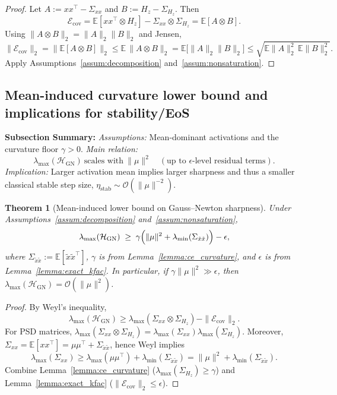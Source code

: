 \documentclass[11pt]{article}
\newtheorem{theorem}{Theorem}
\begin{document}
\begin{proof}
Let $A:=xx^\top-\Sigma_{xx}$ and $B:=H_z-\Sigma_{H_z}$. Then
\[
\mathcal{E}_{\mathrm{cov}}
=
\mathbb{E}[xx^\top\otimes H_z]-\Sigma_{xx}\otimes\Sigma_{H_z}
=
\mathbb{E}[A\otimes B].
\]
Using $\|A\otimes B\|_2=\|A\|_2\|B\|_2$ and Jensen,
\[
\|\mathcal{E}_{\mathrm{cov}}\|_2
=
\bigl\|\mathbb{E}[A\otimes B]\bigr\|_2
\le
\mathbb{E}\,\|A\otimes B\|_2
=
\mathbb{E}\bigl[\|A\|_2\|B\|_2\bigr]
\le
\sqrt{\mathbb{E}\|A\|_2^2\,\mathbb{E}\|B\|_2^2}.
\]
Apply Assumptions~\ref{assum:decomposition} and~\ref{assum:nonsaturation}.
\end{proof}

\subsection{Mean-induced curvature lower bound and implications for stability/EoS}

\textbf{Subsection Summary:}
\textit{Assumptions:} Mean-dominant activations and the curvature floor $\gamma>0$.
\textit{Main relation:} 
\[
\lambda_{\max}(\mathcal{H}_{\mathrm{GN}})\ \text{scales with}\ \|\mu\|^2
\quad (\text{up to }\epsilon\text{-level residual terms}).
\]
\textit{Implication:} Larger activation mean implies larger sharpness and thus a smaller classical stable step size, $\eta_{\mathrm{stab}}\sim\mathcal{O}(\|\mu\|^{-2})$.

\begin{theorem}[Mean-induced lower bound on Gauss--Newton sharpness]
\label{theorem:learning_rate}
Under Assumptions~\ref{assum:decomposition} and~\ref{assum:nonsaturation},
\begin{equation}
  \lambda_{\max}(\mathcal{H}_{\mathrm{GN}})
  \;\ge\;
\gamma\Bigl(\|\mu\|^2+\lambda_{\min}(\Sigma_{\tilde x\tilde x})\Bigr)-\epsilon,
\end{equation}
where $\Sigma_{\tilde x\tilde x}:=\mathbb{E}[\tilde x\tilde x^\top]$, $\gamma$ is from Lemma~\ref{lemma:ce_curvature}, and $\epsilon$ is from Lemma~\ref{lemma:exact_kfac}.
In particular, if $\gamma\|\mu\|^2\gg \epsilon$, then $\lambda_{\max}(\mathcal{H}_{\mathrm{GN}})=\mathcal{O}(\|\mu\|^2)$.
\end{theorem}

\begin{proof}
By Weyl's inequality,
\[
\lambda_{\max}(\mathcal{H}_{\mathrm{GN}})
\ge
\lambda_{\max}(\Sigma_{xx}\otimes\Sigma_{H_z})-\|\mathcal{E}_{\mathrm{cov}}\|_2.
\]
For PSD matrices, $\lambda_{\max}(\Sigma_{xx}\otimes\Sigma_{H_z})=\lambda_{\max}(\Sigma_{xx})\lambda_{\max}(\Sigma_{H_z})$.
Moreover, $\Sigma_{xx}=\mathbb{E}[xx^\top]=\mu\mu^\top+\Sigma_{\tilde x\tilde x}$, hence Weyl implies
\[
\lambda_{\max}(\Sigma_{xx})
\ge
\lambda_{\max}(\mu\mu^\top)+\lambda_{\min}(\Sigma_{\tilde x\tilde x})
=
\|\mu\|^2+\lambda_{\min}(\Sigma_{\tilde x\tilde x}).
\]
Combine Lemma~\ref{lemma:ce_curvature} ($\lambda_{\max}(\Sigma_{H_z})\ge\gamma$) and Lemma~\ref{lemma:exact_kfac} ($\|\mathcal{E}_{\mathrm{cov}}\|_2\le\epsilon$).
\end{proof}
\end{document}
